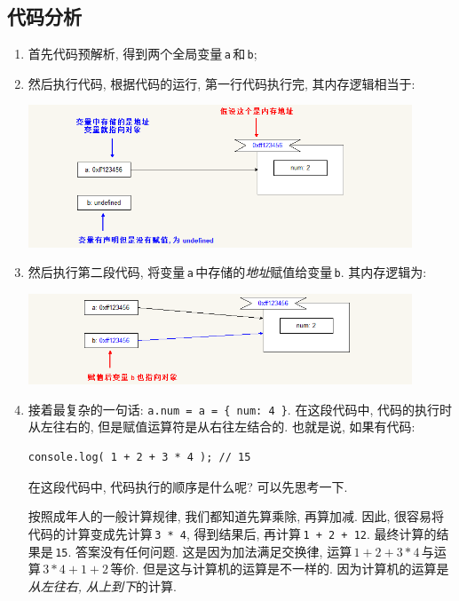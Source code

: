 \documentclass[UTF8, noindent]{ctexart}
\begin{document}
\subsection{代码分析}

\begin{enumerate}

\item 首先代码预解析, 得到两个全局变量\,\lstinline|a|\,和\,\lstinline|b|;
\item 然后执行代码, 根据代码的运行, 第一行代码执行完, 其内存逻辑相当于:

{\centering\noindent\includegraphics[width=0.9\textwidth]{imgs/2018-01-16_155948.png}}

\item 然后执行第二段代码, 将变量\,\lstinline|a|\,中存储的\emph{地址}赋值给变量\,\lstinline|b|. 其内存逻辑为:

{\centering\noindent\includegraphics[width=0.9\textwidth]{imgs/2018-01-16_160904.png}}

\item 接着最复杂的一句话: \lstinline|a.num = a = { num: 4 }|. 在这段代码中, 代码的执行时从左往右的, 
      但是赋值运算符是从右往左结合的. 也就是说, 如果有代码:
    
\begin{lstlisting}
console.log( 1 + 2 + 3 * 4 ); // 15
\end{lstlisting}

      在这段代码中, 代码执行的顺序是什么呢? 可以先思考一下.

      按照成年人的一般计算规律, 我们都知道先算乘除, 再算加减. 因此, 很容易将代码的计算变成先计算\,\lstinline|3 * 4|,
      得到结果后, 再计算\,\lstinline|1 + 2 + 12|. 最终计算的结果是\,\lstinline|15|. 
      答案没有任何问题. 这是因为加法满足交换律, 运算\,$1+2+3*4$\,与运算\,$3*4+1+2$\,等价.
      但是这与计算机的运算是不一样的. 因为计算机的运算是\emph{从左往右, 从上到下}的计算.


\end{enumerate}
\end{document}
